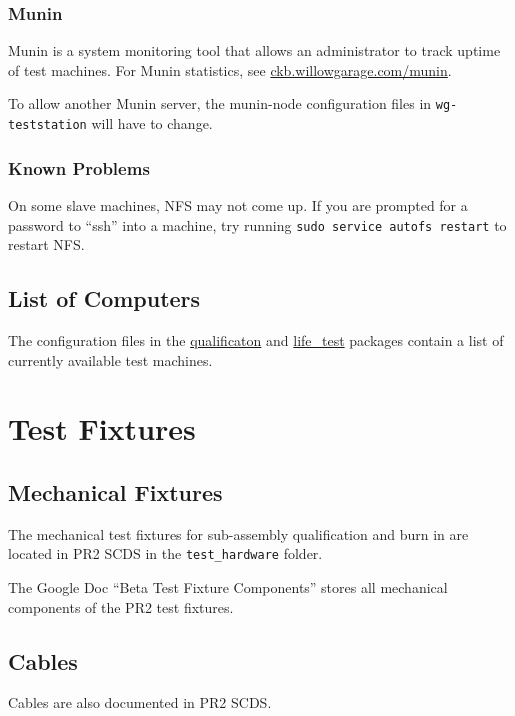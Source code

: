 \documentclass[11pt]{report}
\begin{document}
\subsection{Munin}

Munin is a system monitoring tool that allows an administrator to track uptime of test machines. For Munin statistics, see \href{http://ckb.willowgarage.com/munin}{ckb.willowgarage.com/munin}.

To allow another Munin server, the munin-node configuration files in \texttt{wg-teststation} will have to change.

\subsection{Known Problems}

On some slave machines, NFS may not come up. If you are prompted for a password to ``ssh'' into a machine, try running \texttt{sudo service autofs restart} to restart NFS.

\section{List of Computers}

The configuration files in the \href{http://www.ros.org/wiki/qualification}{qualificaton} and \href{http://www.ros.org/wiki/life\_test}{life\_test} packages contain a list of currently available test machines. 

\chapter{Test Fixtures}

\section{Mechanical Fixtures}

The mechanical test fixtures for sub-assembly qualification and burn in are located in PR2 SCDS in the \texttt{test\_hardware} folder.

The Google Doc ``Beta Test Fixture Components'' stores all mechanical components of the PR2 test fixtures.

\section{Cables}

Cables are also documented in PR2 SCDS.
\end{document}
